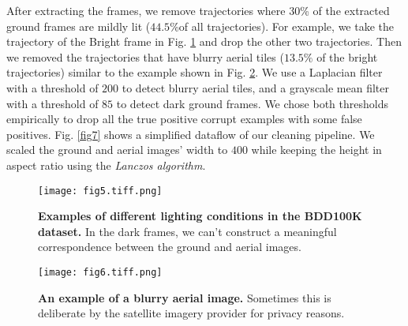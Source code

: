 \documentclass[10pt,letterpaper]{article}
\newif\ifhighlight
\newcommand{\hlb}[1]{\ifhighlight{\hl{#1}}\else{#1}\fi}
\newif\ifmaps
\newcommand{\maps}[1]{\ifmaps{#1}\fi}
\begin{document}
\maps{
\begin{figure}[!ht]
  \caption{{\bf Examples of three different zoom levels for aerial tile. Markers are 10 m apart on the trajectory.} Maps Data: Google, \copyright \ 2022 / Maxar Technologies.}
  \texttt{[image: fig3.tiff.png]}
  \label{fig3}
\end{figure}

\begin{figure}[!ht]
  \caption{{\bf An example of different tile sizes for the same zoom level.} Maps Data: Google, \copyright \ 2022 / Maxar Technologies.}
  \texttt{[image: fig4.tiff.png]}

  \label{fig4}
\end{figure}
}

After extracting the frames, we remove trajectories where 30\% of the extracted ground frames are mildly lit ($44.5\%$of all trajectories). For example, we take the trajectory of the Bright frame in \hlb{Fig.} \ref{fig5} and drop the other two trajectories. Then we removed the trajectories that have blurry aerial tiles ($13.5\%$ of the bright trajectories) similar to the example shown in \hlb{Fig.} \ref{fig6}. We use a Laplacian filter~\cite{bib11} with a threshold of $200$ to detect blurry aerial tiles, and a grayscale mean filter with a threshold of $85$ to detect dark ground frames. We chose both thresholds empirically to drop all the true positive corrupt examples with some false positives. \hlb{Fig.} \ref{fig7} shows a simplified dataflow of our cleaning pipeline. We scaled the ground and aerial images’ width to $400$ while keeping the height in aspect ratio using the \emph{Lanczos algorithm}.

\begin{figure}[!ht]
  \caption{{\bf Examples of different lighting conditions in the BDD100K dataset.} In the dark frames, we can't construct a meaningful correspondence between the ground and aerial images.}
  \texttt{[image: fig5.tiff.png]}

  \label{fig5}
\end{figure}

\begin{figure}[!ht]
  \centering
  \caption{{\bf An example of a blurry aerial image.} Sometimes this is deliberate by the satellite imagery provider for privacy reasons.}
  \texttt{[image: fig6.tiff.png]}

  \label{fig6}
\end{figure}
\end{document}
